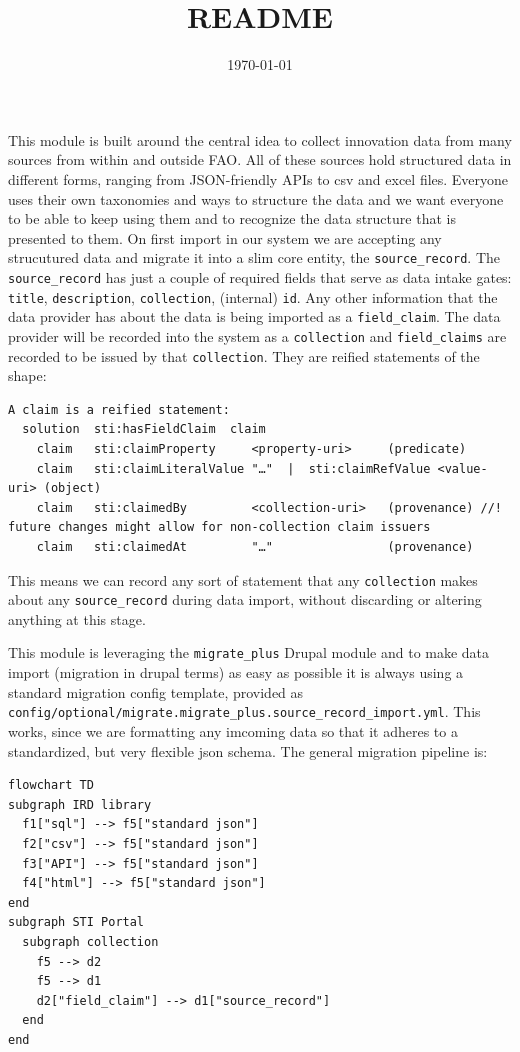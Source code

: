 \documentclass{scrartcl}
\date{\today}
\title{README}
\begin{document}
\maketitle
\tableofcontents

This module is built around the central idea to collect innovation data from many sources from within and outside FAO. All of these sources hold structured data in different forms, ranging from JSON-friendly APIs to csv and excel files. Everyone uses their own taxonomies and ways to structure the data and we want everyone to be able to keep using them and to recognize the data structure that is presented to them.
On first import in our system we are accepting any strucutured data and migrate it into a slim core entity, the \texttt{source\_record}. The \texttt{source\_record} has just a couple of required fields that serve as data intake gates: \texttt{title}, \texttt{description}, \texttt{collection}, (internal) \texttt{id}. Any other information that the data provider has about the data is being imported as a \texttt{field\_claim}. The data provider will be recorded into the system as a \texttt{collection} and \texttt{field\_claims} are recorded to be issued by that \texttt{collection}. They are reified statements of the shape:
\begin{verbatim}
A claim is a reified statement:
  solution  sti:hasFieldClaim  claim
    claim   sti:claimProperty     <property-uri>     (predicate)
    claim   sti:claimLiteralValue "…"  |  sti:claimRefValue <value-uri> (object)
    claim   sti:claimedBy         <collection-uri>   (provenance) //! future changes might allow for non-collection claim issuers
    claim   sti:claimedAt         "…"                (provenance)
\end{verbatim}
This means we can record any sort of statement that any \texttt{collection} makes about any \texttt{source\_record} during data import, without discarding or altering anything at this stage.

This module is leveraging the \texttt{migrate\_plus} Drupal module and to make data import (migration in drupal terms) as easy as possible it is always using a standard migration config template, provided as \texttt{config/optional/migrate.migrate\_plus.source\_record\_import.yml}. This works, since we are formatting any imcoming data so that it adheres to a standardized, but very flexible json schema. The general migration pipeline is:

\begin{verbatim}
flowchart TD
subgraph IRD library
  f1["sql"] --> f5["standard json"]
  f2["csv"] --> f5["standard json"]
  f3["API"] --> f5["standard json"]
  f4["html"] --> f5["standard json"]
end
subgraph STI Portal
  subgraph collection
    f5 --> d2
    f5 --> d1
    d2["field_claim"] --> d1["source_record"] 
  end
end
\end{verbatim}
\end{document}
